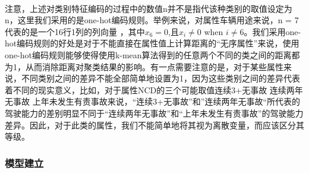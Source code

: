 \documentclass[a4paper]{article}
\begin{document}
			\paragraph{}注意，上述对类别特征编码的过程中的数值n并不是指代该种类别的取值设定为n，这里我们采用的是one-hot编码规则。举例来说，对属性车辆用途来说，n = 7代表的是一个16行1列的列向量
			，其中$x_6 = 0 $,且$x_i \neq  0 $ when $i \neq  6 $。我们采用one-hot编码规则的好处是对于不能直接在属性值上计算距离的“无序属性”来说，使用one-hot编码规则能够使得使用k-mean算法得到的任意两个不同的类之间的距离都为1，从而消除距离对聚类结果的影响。有一点需要注意的是，对于某些属性来说，不同类别之间的差异不能全部简单地设置为1，因为这些类别之间的差异代表着不同的现实意义，比如，对于属性NCD的三个可能取值{连续3+无事故 连续两年无事故 上年未发生有责事故}来说，“连续3+无事故”和”连续两年无事故“所代表的驾驶能力的差别明显不同于“连续两年无事故”和“上年未发生有责事故”的驾驶能力差异。因此，对于此类的属性，我们不能简单地将其视为离散变量，而应该区分其等级。
		\subsubsection{模型建立}
\end{document}
